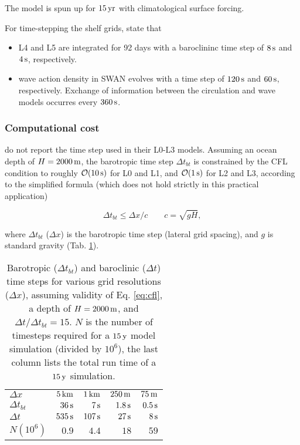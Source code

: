 \documentclass[12pt,a4paper]{article}
\begin{document}
The model is spun up for $15\,\rm yr$ with climatological surface forcing.


For time-stepping the shelf grids, \cite{kumar2015midshelf} state that

\begin{itemize}
	\item L4 and L5 are integrated for 92 days with a baroclininc time step of $8\,\rm s$ and $4\,\rm s$, respectively.
	\item wave action density in SWAN evolves with a time step of $120\,\rm s$ and $60\,\rm s$, respectively. Exchange of information between the circulation and wave models occurres every $360\,\rm s$.
\end{itemize}


\subsubsection{Computational cost}

\cite{kumar2015midshelf} do not report the time step used in their L0-L3 models. Assuming an ocean depth of $H=2000\,\rm m$, the barotropic time step $\Delta t_{bt}$ is constrained by the CFL condition to roughly $\mathcal{O}(10\,\rm s)$ for L0 and L1, and $\mathcal{O}(1\,\rm s)$ for L2 and L3, according to the simplified formula (which does not hold strictly in this practical application)

\begin{equation}\label{eq:cfl}
\Delta t_{bt}\leq\Delta x/c \qquad c=\sqrt{gH},
\end{equation}

where $\Delta t_{bt}$ ($\Delta x$) is the barotropic time step (lateral grid spacing), and $g$ is standard gravity (Tab. \ref{tab:timesteps}). 

\begin {table}[H]
\begin{center}
	\begin{tabular}{ l | r | r | r| r }
		           $\Delta x$     & $5\,\rm km$ & $1\,\rm km$ & $250\,\rm m$ & $75\,\rm m$\\
		 $\Delta t_{bt}$       &  $36\,\rm s$ & $7\,\rm s$   &$1.8\,\rm s$       &  $0.5\,\rm s$\\
		 $\Delta t$       &  $535\,\rm s$ & $107\,\rm s$   &$27\,\rm s$       &  $8\,\rm s$ \\
		 $N (10^6)$                  &  $0.9$ & $4.4$   &$18$       &  $59$
	\end{tabular}

\end{center}\caption{Barotropic ($\Delta t_{bt}$) and baroclinic ($\Delta t$) time steps for various grid resolutions ($\Delta x$), assuming validity of Eq. \eqref{eq:cfl}, a depth of $H=2000\,\rm m$,  and  $\Delta t/\Delta t_{bt}=15$. $N$ is the number of timesteps required for a $15\,\rm y$ model simulation (divided by $10^6$), the last column lists the total run time of a $15\,\rm y$ simulation.}\label{tab:timesteps}
\end{table}
\end{document}
